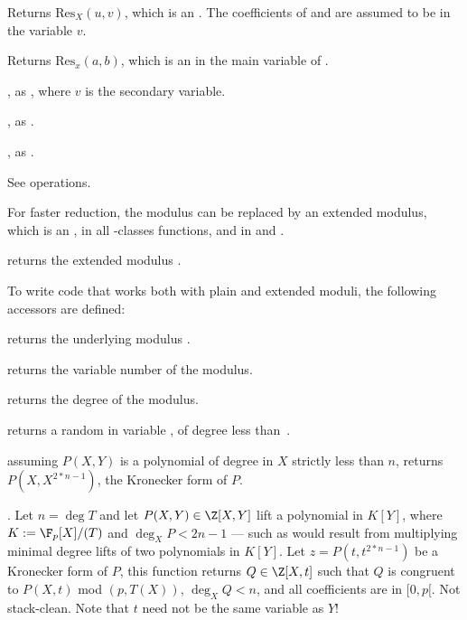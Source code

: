  Returns
$\text{Res}_X(u, v)$, which is an . The coefficients of 
and  are assumed to be in the variable $v$.

Returns $\text{Res}_x(a, b)$, which is an 
in the main variable of .

, as ,
where $v$ is the secondary variable.

, as .

, as
.

 See  operations.


For faster reduction, the modulus  can be replaced by an extended
modulus, which is an , in all -classes
functions, and in  and .

 returns the extended modulus
.

To write code that works both with plain and extended moduli, the following
accessors are defined:

 returns the underlying modulus .

 returns the variable number of the modulus.

 returns the degree of the modulus.


 returns a random
 in variable , of degree less than~.

 assuming $P(X,Y)$ is a polynomial
of degree in $X$ strictly less than $n$, returns $P(X,X^{2*n-1})$, the
Kronecker form of $P$.

. Let $n = \deg T$ and let
$P(X,Y)\in \Z[X,Y]$ lift a polynomial in $K[Y]$, where $K := \F_p[X]/(T)$ and
$\deg_X P < 2n-1$ --- such as would result from multiplying minimal degree
lifts of two polynomials in $K[Y]$. Let $z = P(t,t^{2*n-1})$ be a Kronecker
form of $P$, this function returns $Q\in \Z[X,t]$ such that $Q$ is congruent to
$P(X,t)$ mod $(p, T(X))$, $\deg_X Q < n$, and all coefficients are in $[0,p[$.
Not stack-clean. Note that $t$ need not be the same variable as $Y$!

